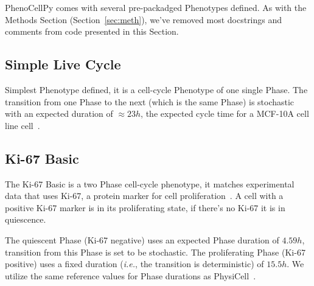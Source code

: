 PhenoCellPy comes with several pre-packadged Phenotypes defined. As with the Methods Section (Section~\ref{sec:meth}), we've removed most docstrings and comments from code presented in this Section. 

\subsection{Simple Live Cycle}\label{sec:predef:simp-live}
Simplest Phenotype defined, it is a cell-cycle Phenotype of one single Phase. The transition from one Phase to the next (which is the same Phase) is stochastic with an expected duration of $\approx23h$, the expected cycle time for a MCF-10A cell line cell~\cite{noauthor_mcf-10a_nodate}. %


\subsection{Ki-67 Basic}\label{sec:predef:ki67-basic}
The Ki-67 Basic is a two Phase cell-cycle phenotype, it matches experimental data that uses Ki-67, a protein marker for cell proliferation~\cite{mckeown_defining_2014}. A cell with a positive Ki-67 marker is in its proliferating state, if there's no Ki-67 it is in quiescence.

The quiescent Phase (Ki-67 negative) uses an expected Phase duration of $4.59h$, transition from this Phase is set to be stochastic. The proliferating Phase (Ki-67 positive) uses a fixed duration (\textit{i.e.}, the transition is deterministic) of $15.5h$. We utilize the same reference values for Phase durations as PhysiCell~\cite{ghaffarizadeh_physicell_2018}. 


